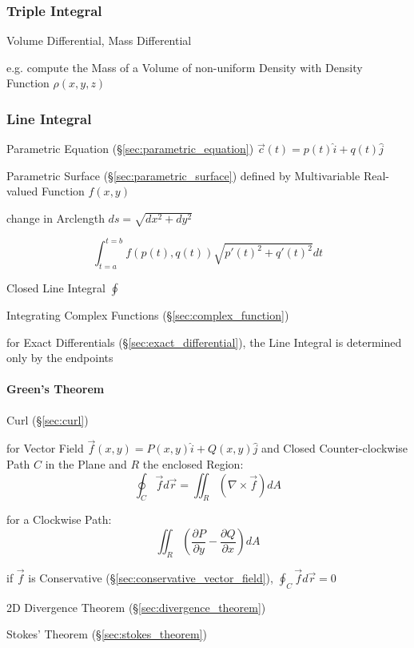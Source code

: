 \subsubsection{Triple Integral}\label{sec:triple_integral}

Volume Differential, Mass Differential

e.g. compute the Mass of a Volume of non-uniform Density with Density Function
$\rho(x,y,z)$



\subsubsection{Line Integral}\label{sec:line_integral}

Parametric Equation (\S\ref{sec:parametric_equation}) $\vec{c}(t) = p(t)\hat{i}
+ q(t)\hat{j}$

Parametric Surface (\S\ref{sec:parametric_surface}) defined by Multivariable
Real-valued Function $f(x,y)$

change in Arclength $ds = \sqrt{dx^2 + dy^2}$

\[
  \int_{t=a}^{t=b} f(p(t),q(t)) \sqrt{p'(t)^2 + q'(t)^2} dt
\]

Closed Line Integral $\oint$

Integrating Complex Functions (\S\ref{sec:complex_function})

for Exact Differentials (\S\ref{sec:exact_differential}), the Line Integral is
determined only by the endpoints



\paragraph{Green's Theorem}\label{sec:greens_theorem}\hfill

Curl (\S\ref{sec:curl})

for Vector Field $\vec{f}(x,y) = P(x,y)\hat{i} + Q(x,y)\hat{j}$ and Closed
Counter-clockwise Path $C$ in the Plane and $R$ the enclosed Region:
\[
  \oint_C \vec{f} d\vec{r} = \iint_R (\nabla \times \vec{f}) dA
\]

for a Clockwise Path:
\[
  \iint_R (\frac{\partial{P}}{\partial{y}} - \frac{\partial{Q}}{\partial{x}}) dA
\]

if $\vec{f}$ is Conservative (\S\ref{sec:conservative_vector_field}), $\oint_C
\vec{f} d\vec{r} = 0$

\fist 2D Divergence Theorem (\S\ref{sec:divergence_theorem})

\fist Stokes' Theorem (\S\ref{sec:stokes_theorem})

